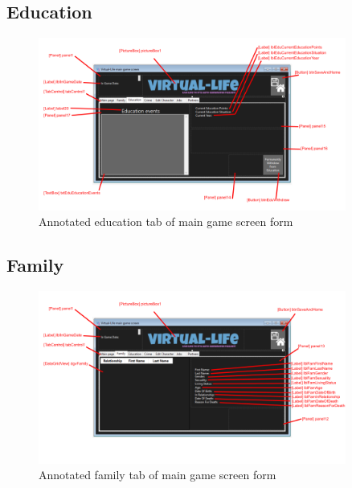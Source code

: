 \subsection{Education}
\begin{figure}[H]
    \centering
    \includegraphics[width=0.9\textwidth]{images/forms/main-education.png}
    \caption{Annotated education tab of main game screen form}
    \label{fig:forms-main-education}
\end{figure}

\subsection{Family}
\begin{figure}[H]
    \centering
    \includegraphics[width=0.9\textwidth]{images/forms/main-family.png}
    \caption{Annotated family tab of main game screen form}
    \label{fig:forms-main-family}
\end{figure}

